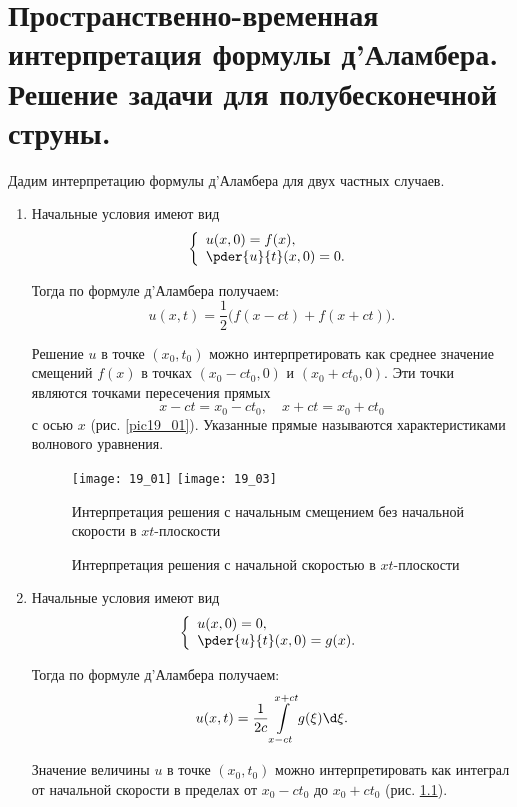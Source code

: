 \chapter{Пространственно-временная интерпретация формулы д'Аламбера. Решение
задачи для полубесконечной струны.}

Дадим интерпретацию формулы д'Аламбера для двух частных случаев.
\begin{enumerate}
    \item Начальные условия имеют вид
    \[
        \left\{ \begin{array}{l}
            u(x, 0) = f(x), \\
            \ds \pder{u}{t}(x, 0) = 0.
        \end{array} \right.
    \]
    
    Тогда по формуле д'Аламбера получаем:
    \[
        u(x, t) = \frac{1}{2}\bigl(f(x - ct) + f(x + ct)\bigr).
    \]
    
    Решение \( u \) в точке \( (x_0, t_0) \) можно интерпретировать как среднее
    значение смещений \( f(x) \) в точках \( (x_0 - ct_0, 0) \) и
    \( (x_0 + ct_0, 0) \). Эти точки являются точками пересечения прямых
    \[
        x - ct = x_0 - ct_0, \quad x + ct = x_0 + ct_0
    \]
    с осью \( x \) (рис. \ref{pic19_01}). Указанные прямые называются характеристиками волнового
    уравнения.

    \begin{figure}[h!]
        \texttt{[image: 19\_01]}\hfill
        \texttt{[image: 19\_03]}
        \parbox{.47\textwidth}{\caption{Интерпретация решения с начальным
        смещением без начальной скорости в \( xt \)-плоскости} \label{pic19_01}}
        \hfill
        \parbox{.47\textwidth}{\caption{Интерпретация решения с начальной
        скоростью в \( xt \)-плоскости} \label{pic19_03}}
    \end{figure}

    \item Начальные условия имеют вид
    \[
        \left\{ \begin{array}{l}
            u(x, 0) = 0, \\
            \ds \pder{u}{t}(x, 0) = g(x).
        \end{array} \right.
    \]
    
    Тогда по формуле д'Аламбера получаем:
    \[
        u(x, t) = \frac{1}{2c}\int\limits_{x - ct}^{x + ct} g(\xi)\d\xi.
    \]
    
    Значение величины \( u \) в точке \( (x_0, t_0) \) можно интерпретировать
    как интеграл от начальной скорости в пределах от \( x_0 - ct_0 \) до
    \( x_0 + ct_0 \) (рис. \ref{pic19_03}).
\end{enumerate}

